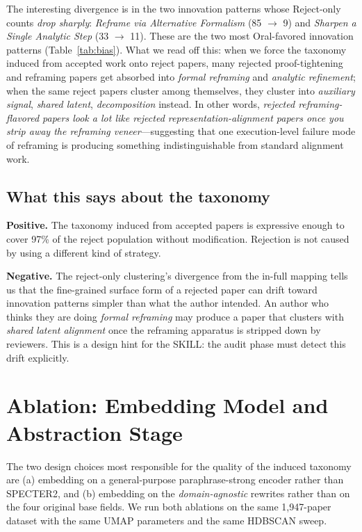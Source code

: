 \documentclass[10pt,a4paper]{article}
\begin{document}
The interesting divergence is in the two innovation patterns whose Reject-only counts \emph{drop sharply}: \emph{Reframe via Alternative Formalism} (85 $\to$ 9) and \emph{Sharpen a Single Analytic Step} (33 $\to$ 11). These are the two most Oral-favored innovation patterns (Table~\ref{tab:bias}). What we read off this: when we force the taxonomy induced from accepted work onto reject papers, many rejected proof-tightening and reframing papers get absorbed into \emph{formal reframing} and \emph{analytic refinement}; when the same reject papers cluster among themselves, they cluster into \emph{auxiliary signal}, \emph{shared latent}, \emph{decomposition} instead. In other words, \emph{rejected reframing-flavored papers look a lot like rejected representation-alignment papers once you strip away the reframing veneer}---suggesting that one execution-level failure mode of reframing is producing something indistinguishable from standard alignment work.

\subsection{What this says about the taxonomy}

\textbf{Positive.} The taxonomy induced from accepted papers is expressive enough to cover 97\% of the reject population without modification. Rejection is not caused by using a different kind of strategy.

\textbf{Negative.} The reject-only clustering's divergence from the in-full mapping tells us that the fine-grained surface form of a rejected paper can drift toward innovation patterns simpler than what the author intended. An author who thinks they are doing \emph{formal reframing} may produce a paper that clusters with \emph{shared latent alignment} once the reframing apparatus is stripped down by reviewers. This is a design hint for the SKILL: the audit phase must detect this drift explicitly.


\section{Ablation: Embedding Model and Abstraction Stage}
\label{sec:ablation}

The two design choices most responsible for the quality of the induced taxonomy are (a) embedding on a general-purpose paraphrase-strong encoder rather than SPECTER2, and (b) embedding on the \emph{domain-agnostic} rewrites rather than on the four original base fields. We run both ablations on the same 1{,}947-paper dataset with the same UMAP parameters and the same HDBSCAN sweep.
\end{document}
